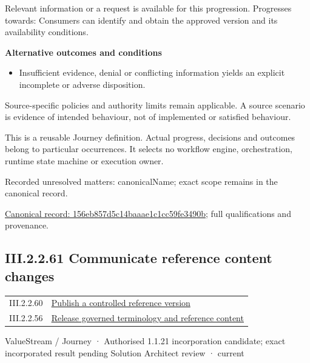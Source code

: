 Relevant information or a request is available for this progression. Progresses towards: Consumers can identify and obtain the approved version and its availability conditions.



\par\medskip\textbf{Alternative outcomes and conditions}\par


\begin{itemize}


\item Insufficient evidence, denial or conflicting information yields an explicit incomplete or adverse disposition.

\end{itemize}


Source-specific policies and authority limits remain applicable. A source scenario is evidence of intended behaviour, not of implemented or satisfied behaviour.



This is a reusable Journey definition. Actual progress, decisions and outcomes belong to particular occurrences. It selects no workflow engine, orchestration, runtime state machine or execution owner.


{\small Recorded unresolved matters: canonicalName; exact scope remains in the canonical record.}\par
{\footnotesize \href{../../../../continuum/strategy/value-stream/156eb857d5c14baaae1c1cc59fe3490b.md}{Canonical record: 156eb857d5c14baaae1c1cc59fe3490b}; full qualifications and provenance.}\par
\subsection*{III.2.2.61 Communicate reference content changes}
\label{navigation:III.2.2.61}

\begin{longtable}{p{.22\linewidth}p{.73\linewidth}}
III.2.2.60 & \hyperref[element:156eb857d5c14baaae1c1cc59fe3490b]{Publish a controlled reference version} \\
III.2.2.56 & \hyperref[element:e9a8a77c5f9c4361af4dfcfa607ece2d]{Release governed terminology and reference content} \\
\end{longtable}
\label{element:9faf0704382e4b428814c2e9bf72eec0}
{\small ValueStream / Journey · Authorised 1.1.21 incorporation candidate; exact incorporated result pending Solution Architect review · current}\par

